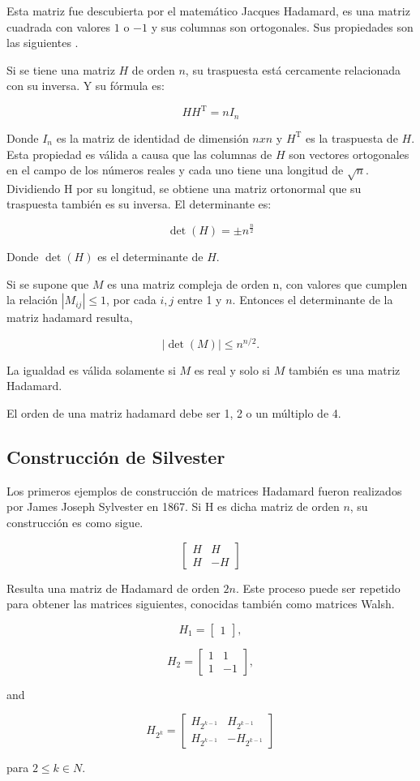 Esta matriz fue descubierta por el matemático Jacques Hadamard, es una matriz cuadrada con valores $1$ o $-1$ y sus columnas 
son ortogonales. Sus propiedades son las siguientes \cite{Seberry2005}. 

Si se tiene una matriz $H$ de orden $n$, su traspuesta está cercamente relacionada con su inversa. Y su fórmula es:

$$ H H^{\mathrm{T}} = n I_n $$

Donde $I_n$ es la matriz de identidad de dimensión $n x n$ y $H^\mathrm{T}$ es la traspuesta de $H$. Esta propiedad es válida a causa 
que las columnas de $H$ son vectores ortogonales en el campo de los números reales y cada uno tiene una longitud de $\sqrt n$.
Dividiendo H por su longitud, se obtiene una matriz ortonormal que su traspuesta también es su inversa. El determinante es:

$$ \operatorname{det}(H) = \pm n^{\frac{n}{2}} $$

Donde $\operatorname{det}(H)$ es el determinante de $H$.

Si se supone que $M$ es una matriz compleja de orden n, con valores que cumplen la relación $|M_{ij}| \le 1$, por cada $i,j$ 
entre 1 y $n$. Entonces el determinante de la matriz hadamard resulta,
		    
$$ |\operatorname{det}(M)| \leq n^{n/2}. $$

La igualdad es válida solamente si $M$ es real y solo si $M$ también es una matriz Hadamard.

El orden de una matriz hadamard debe ser 1, 2 o un múltiplo de 4.

\subsection{Construcción de Silvester}

Los primeros ejemplos de construcción de matrices Hadamard fueron realizados por James Joseph Sylvester en 1867. Si H es 
dicha matriz de orden $n$, su construcción es como sigue.

$$ \begin{bmatrix} H & H\\H & -H\end{bmatrix} $$

Resulta una matriz de Hadamard de orden $2n$. Este proceso puede ser repetido para obtener las matrices siguientes, 
conocidas también como matrices Walsh. 

$$ H_1 = \begin{bmatrix} 1 \end{bmatrix}, $$

$$  H_2 = \begin{bmatrix} 1 & 1 \\ 1 & -1 \end{bmatrix}, $$

and

$$ H_{2^k} = \begin{bmatrix} H_{2^{k-1}} & H_{2^{k-1}}\\ H_{2^{k-1}} & -H_{2^{k-1}}\end{bmatrix} $$

para $2 \le k \in N$.
